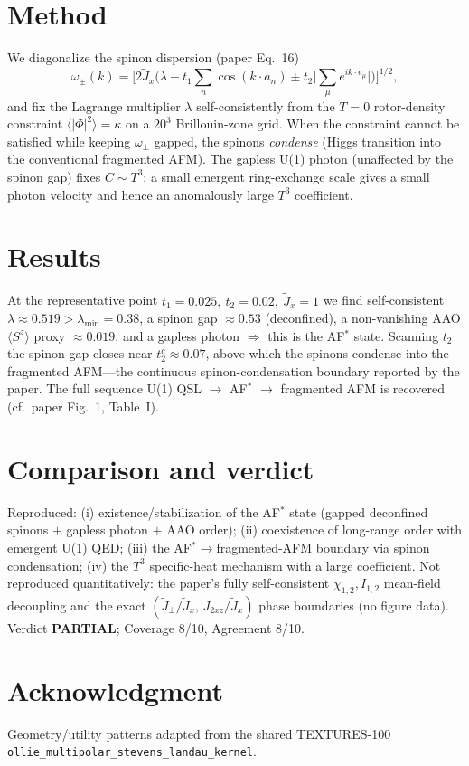 \documentclass[aps,prb,twocolumn,superscriptaddress,floatfix]{revtex4-2}
\begin{document}
\section{Method}
We diagonalize the spinon dispersion (paper Eq.~16)
\begin{equation}
\omega_\pm(k)=\Big[2\tilde J_x\big(\lambda - t_1\!\sum_n\cos(k\!\cdot\!a_n)
\pm t_2\big|\!\sum_\mu e^{ik\cdot e_\mu}\big|\big)\Big]^{1/2},
\end{equation}
and fix the Lagrange multiplier $\lambda$ self-consistently from the $T=0$ rotor-density
constraint $\langle|\Phi|^2\rangle=\kappa$ on a $20^3$ Brillouin-zone grid. When the
constraint cannot be satisfied while keeping $\omega_\pm$ gapped, the spinons
\emph{condense} (Higgs transition into the conventional fragmented AFM). The gapless U(1)
photon (unaffected by the spinon gap) fixes $C\sim T^3$; a small emergent ring-exchange
scale gives a small photon velocity and hence an anomalously large $T^3$ coefficient.

\section{Results}
At the representative point $t_1=0.025,\ t_2=0.02,\ \tilde J_x=1$ we find self-consistent
$\lambda\!\approx\!0.519>\lambda_{\min}\!=\!0.38$, a spinon gap $\approx0.53$ (deconfined),
a non-vanishing AAO $\langle S^z\rangle$ proxy $\approx0.019$, and a gapless photon
$\Rightarrow$ this is the AF$^{*}$ state. Scanning $t_2$ the spinon gap closes near
$t_2^c\!\approx\!0.07$, above which the spinons condense into the fragmented AFM---the
continuous spinon-condensation boundary reported by the paper. The full sequence
U(1) QSL $\to$ AF$^{*}$ $\to$ fragmented AFM is recovered (cf.\ paper Fig.~1, Table~I).

\section{Comparison and verdict}
Reproduced: (i) existence/stabilization of the AF$^{*}$ state (gapped deconfined spinons
$+$ gapless photon $+$ AAO order); (ii) coexistence of long-range order with emergent
U(1) QED; (iii) the AF$^{*}\to$fragmented-AFM boundary via spinon condensation; (iv) the
$T^{3}$ specific-heat mechanism with a large coefficient. Not reproduced quantitatively:
the paper's fully self-consistent $\chi_{1,2},I_{1,2}$ mean-field decoupling and the exact
$(\tilde J_\perp/\tilde J_x,\,J_{2xz}/\tilde J_x)$ phase boundaries (no figure data).
Verdict \textbf{PARTIAL}; Coverage 8/10, Agreement 8/10.

\section*{Acknowledgment}
Geometry/utility patterns adapted from the shared TEXTURES-100
\texttt{ollie\_multipolar\_stevens\_landau\_kernel}.
\end{document}
